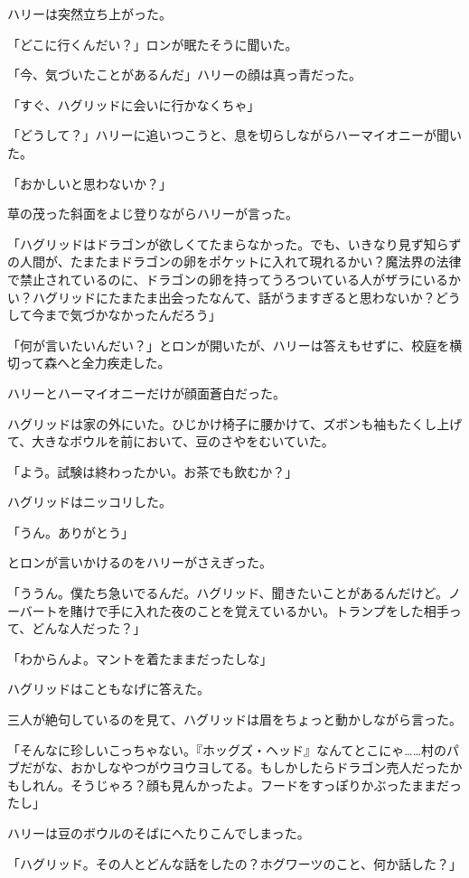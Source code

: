 \documentclass[10pt,a4paper]{article}
\begin{document}
\begin{CJK}{UTF8}{min}
ハリーは突然立ち上がった。

「どこに行くんだい？」ロンが眠たそうに聞いた。

「今、気づいたことがあるんだ」ハリーの顔は真っ青だった。

「すぐ、ハグリッドに会いに行かなくちゃ」

「どうして？」ハリーに追いつこうと、息を切らしながらハーマイオニーが聞いた。

「おかしいと思わないか？」

草の茂った斜面をよじ登りながらハリーが言った。

「ハグリッドはドラゴンが欲しくてたまらなかった。でも、いきなり見ず知らずの人間が、たまたまドラゴンの卵をポケットに入れて現れるかい？魔法界の法律で禁止されているのに、ドラゴンの卵を持ってうろついている人がザラにいるかい？ハグリッドにたまたま出会ったなんて、話がうますぎると思わないか？どうして今まで気づかなかったんだろう」

「何が言いたいんだい？」とロンが開いたが、ハリーは答えもせずに、校庭を横切って森へと全力疾走した。

ハリーとハーマイオニーだけが顔面蒼白だった。

ハグリッドは家の外にいた。ひじかけ椅子に腰かけて、ズボンも袖もたくし上げて、大きなボウルを前において、豆のさやをむいていた。

「よう。試験は終わったかい。お茶でも飲むか？」

ハグリッドはニッコリした。

「うん。ありがとう」

とロンが言いかけるのをハリーがさえぎった。

「ううん。僕たち急いでるんだ。ハグリッド、聞きたいことがあるんだけど。ノーバートを賭けで手に入れた夜のことを覚えているかい。トランプをした相手って、どんな人だった？」

「わからんよ。マントを着たままだったしな」

ハグリッドはこともなげに答えた。

三人が絶句しているのを見て、ハグリッドは眉をちょっと動かしながら言った。

「そんなに珍しいこっちゃない。『ホッグズ・ヘッド』なんてとこにゃ……村のパブだがな、おかしなやつがウヨウヨしてる。もしかしたらドラゴン売人だったかもしれん。そうじゃろ？顔も見んかったよ。フードをすっぽりかぶったままだったし」

ハリーは豆のボウルのそばにへたりこんでしまった。

「ハグリッド。その人とどんな話をしたの？ホグワーツのこと、何か話した？」


\end{CJK}
\end{document}
